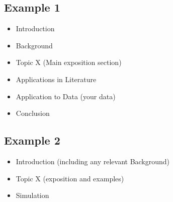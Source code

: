 \documentclass[12pt]{article}
\providecommand{\tightlist}{%
  \setlength{\itemsep}{0pt}\setlength{\parskip}{0pt}}
\begin{document}
\hypertarget{example-1}{%
\subsection{Example 1}\label{example-1}}

\begin{itemize}
\tightlist
\item
  Introduction
\item
  Background
\item
  Topic X (Main exposition section)
\item
  Applications in Literature
\item
  Application to Data (your data)
\item
  Conclusion
\end{itemize}

\hypertarget{example-2}{%
\subsection{Example 2}\label{example-2}}

\begin{itemize}
\tightlist
\item
  Introduction (including any relevant Background)
\item
  Topic X (exposition and examples)
\item
  Simulation
\end{itemize}



\end{document}
